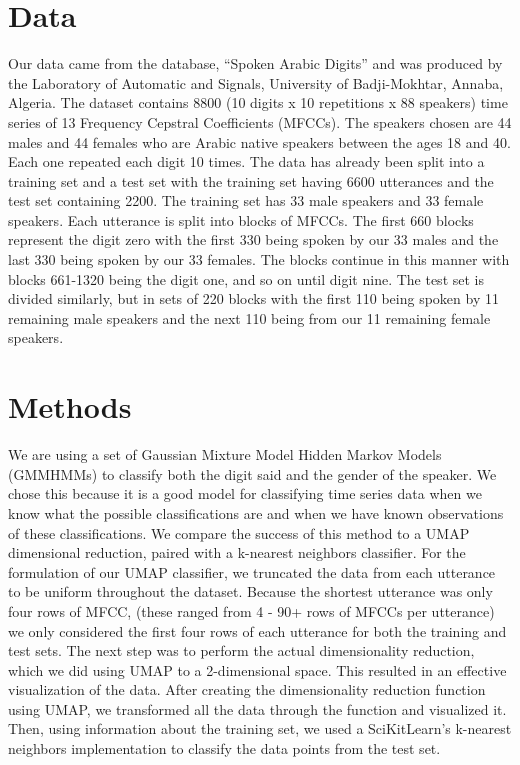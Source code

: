 \documentclass[11pt]{article}
\newcommand{\0}{{\vec  0 }}
\newcommand{\1}{{\mathbbm{  1} }}
\begin{document}
    \section{Data}
    Our data came from the database, “Spoken Arabic Digits” and was produced by the Laboratory of Automatic and Signals, University of Badji-Mokhtar, Annaba, Algeria. The dataset contains 8800 (10 digits x 10 repetitions x 88 speakers) time series of 13 Frequency Cepstral
    Coefficients (MFCCs). The speakers chosen are 44 males and 44 females who are Arabic native speakers between the ages 18 and 40. Each one repeated each digit 10 times. The data has already been split into a training set and a test set with the training set having 6600 utterances and the test set containing 2200. The training set has 33 male speakers and 33 female speakers. Each utterance is split into blocks of MFCCs. The first 660 blocks represent the digit zero with the first 330 being spoken by our 33 males and the last 330 being spoken by our 33 females. The blocks continue in this manner with blocks 661-1320 being the digit one, and so on until digit nine. The test set is divided similarly, but in sets of 220 blocks with the first 110 being spoken by 11 remaining male speakers and the next 110 being from our 11 remaining female speakers. 
    
    \section{Methods}
    We are using a set of Gaussian Mixture Model Hidden Markov Models (GMMHMMs) to classify both the digit said and the gender of the speaker. We chose this because it is a good model for classifying time series data when we know what the possible classifications are and when we have known observations of these classifications. We compare the success of this method to a UMAP dimensional reduction, paired with a k-nearest neighbors classifier.
    For the formulation of our UMAP classifier, we truncated the data from each utterance to be uniform throughout the dataset. Because the shortest utterance was only four rows of MFCC, (these ranged from 4 - 90+ rows of MFCCs per utterance) we only considered the first four rows of each utterance for both the training and test sets. The next step was to perform the actual dimensionality reduction, which we did using UMAP to a 2-dimensional space. This resulted in an effective visualization of the data. After creating the dimensionality reduction function using UMAP, we transformed all the data through the function and visualized it. Then, using information about the training set, we used a SciKitLearn’s k-nearest neighbors implementation to classify the data points from the test set.
    
\end{document}
